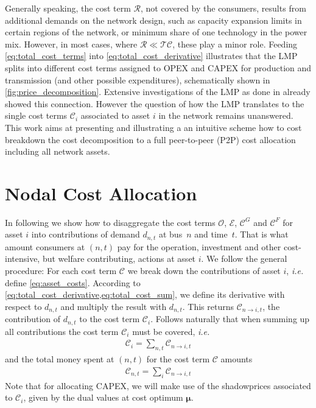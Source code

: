 \documentclass[11pt,twocolumn]{article}
\newcommand{\ie}{\textit{i.e.} }
\newcommand{\demand}[1][n]{d_{#1,t}}
\newcommand{\totalcost}{\mathcal{TC}}
\newcommand{\cost}{\mathcal{C}}
\newcommand{\opexgeneration}{\mathcal{O}}
\newcommand{\capexgeneration}{\mathcal{C}^G}
\newcommand{\capexflow}{\mathcal{C}^F}
\newcommand{\emissioncost}{\mathcal{E}}
\newcommand{\remainingcost}{\mathcal{R}}
\begin{document}
% 
Generally speaking, the cost term $\remainingcost$, not covered by the consumers, results from additional demands on the network design, such as capacity expansion limits in certain regions of the network, or minimum share of one technology in the power mix. However, in most cases, where $\remainingcost \ll  \totalcost$, these play a minor role. Feeding \cref{eq:total_cost_terms} into \cref{eq:total_cost_derivative} illustrates that the LMP splits into different cost terms assigned to OPEX and CAPEX for production and transmission (and other possible expenditures), schematically shown in \cref{fig:price_decomposition}. 
Extensive investigations of the LMP as done in \cite{schweppe_spot_1988} already showed this connection. However the question of how the LMP translates to the single cost terms $\cost_i$ associated to asset $i$ in the network remains unanswered. This work aims at presenting and illustrating a an intuitive scheme how to cost breakdown the cost decomposition to a full peer-to-peer (P2P) cost allocation including all network assets. 



\section{Nodal Cost Allocation}
\label{sec:theory}

In following we show how to disaggregate the cost terms $\opexgeneration$, $\emissioncost$, $\capexgeneration$ and $\capexflow$ for asset $i$ into contributions of demand $\demand$ at bus~$n$ and time~$t$. That is what amount consumers at $\left(n, t\right)$ pay for the operation, investment and other cost-intensive, but welfare contributing, actions at asset $i$.  
We follow the general procedure: For each cost term $\cost$ we break down the contributions of asset $i$, \ie define \cref{eq:asset_costs}. According to \cref{eq:total_cost_derivative,eq:total_cost_sum}, we define its derivative with respect to $\demand$ and multiply the result with $\demand$. This returns $\cost_{n\rightarrow i,t}$, the contribution of $\demand$ to the cost term $\cost_i$. Follows naturally that when summing up all contributions the cost term $\cost_i$ must be covered, \ie
\begin{align}
    \cost_i = \sum_{n,t} \cost_{n \rightarrow i, t}
\end{align}
and the total money spent at $\left(n,t\right)$ for the cost term $\cost$ amounts 
\begin{align}
    \cost_{n,t} = \sum_i \cost_{n \rightarrow i, t}
\end{align}
Note that for allocating CAPEX, we will make use of the shadowprices associated to $\cost_i$, given by the dual values at cost optimum $\bm{\mu}$. 
\end{document}
